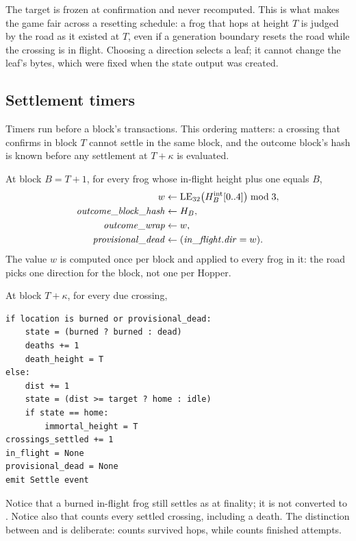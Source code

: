 The target is frozen at confirmation and never recomputed. This is what makes
the game fair across a resetting schedule: a frog that hops at height $T$ is
judged by the road as it existed at $T$, even if a generation boundary resets
the road while the crossing is in flight. Choosing a direction selects a
leaf; it cannot change the leaf's bytes, which were fixed when the state
output was created.

\subsection{Settlement timers}

Timers run before a block's transactions. This ordering matters: a crossing
that confirms in block $T$ cannot settle in the same block, and the outcome
block's hash is known before any settlement at $T+\kappa$ is evaluated.

At block $B=T+1$, for every frog whose in-flight height plus one equals $B$,
\begin{align}
w &\gets \operatorname{LE}_{32}\!\left(H_B^{\rm int}[0..4]\right)\bmod 3,\\
\mathit{outcome\_block\_hash} &\gets H_B,\\
\mathit{outcome\_wrap} &\gets w,\\
\mathit{provisional\_dead} &\gets (\mathit{in\_flight.dir}=w).
\end{align}
The value $w$ is computed once per block and applied to every frog in it: the
road picks one direction for the block, not one per Hopper.

At block $T+\kappa$, for every due crossing,
\begin{lstlisting}[language={},caption={Settlement at $T+\kappa$.},label={lst:settle}]
if location is burned or provisional_dead:
    state = (burned ? burned : dead)
    deaths += 1
    death_height = T
else:
    dist += 1
    state = (dist >= target ? home : idle)
    if state == home:
        immortal_height = T
crossings_settled += 1
in_flight = None
provisional_dead = None
emit Settle event
\end{lstlisting}

Notice that a burned in-flight frog still settles as  at
finality; it is not converted to . Notice also that
 counts every settled crossing, including a death.
The distinction between  and  is
deliberate:  counts survived hops, while
 counts finished attempts.


